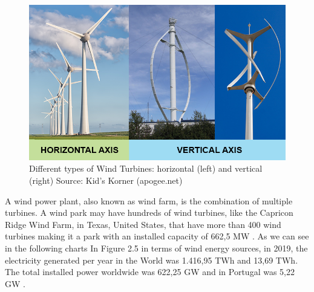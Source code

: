 \begin{figure}[]
	\centering
	\includegraphics[width=\textwidth]{Chapters/Figures/background_fig5.png}
	\caption{Different types of Wind Turbines: horizontal (left) and vertical (right) Source: Kid's Korner (apogee.net) }
	\label{fig:Figuras_Tree_silhouettes-vectorial}
\end{figure}



A wind power plant, also known as wind farm, is the combination of multiple turbines. A wind park may have hundreds of wind turbines, like the Capricon Ridge Wind Farm, in Texas, United States, that have more than 400 wind turbines making it a park with an installed capacity of 662,5 MW \cite{OLD_35_WIND}.
As we can see in the following charts In Figure 2.5 in terms of wind energy sources, in 2019, the electricity generated per year in the World was 1.416,95 TWh and 13,69 TWh. The total installed power worldwide was 622,25 GW and in Portugal was 5,22 GW \cite{OLD_33_GENERAL}.


